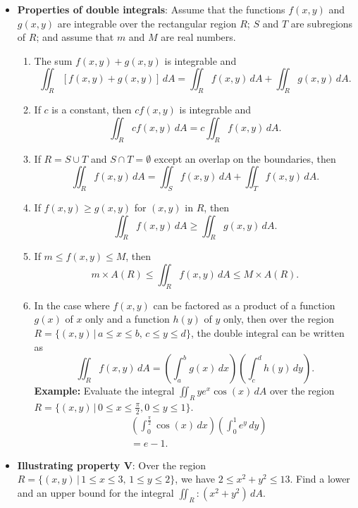 \documentclass{report}
\begin{document}
\begin{itemize}
        \item \textbf{Properties of double integrals}:
            Assume that the functions $f(x,y)$ and $g(x,y)$ are integrable over the rectangular region $R$; $S$ and $T$ are subregions of $R$; and assume that $m$ and $M$ are real numbers.
            \begin{enumerate}[label=\Roman*.]
                \item The sum $f(x,y) + g(x,y)$ is integrable and
                    \[\iint_{R} [f(x,y) + g(x,y)] \, dA = \iint_{R} f(x,y) \, dA + \iint_{R} g(x,y) \, dA.\]
                \item If $c$ is a constant, then $cf(x,y)$ is integrable and
                    \[\iint_{R} cf(x,y) \, dA = c \iint_{R} f(x,y) \, dA.\]
                \item If $R = S \cup T$ and $S \cap T = \emptyset$ except an overlap on the boundaries, then
                    \[\iint_{R} f(x,y) \, dA = \iint_{S} f(x,y) \, dA + \iint_{T} f(x,y) \, dA.\]
                \item If $f(x,y) \geq g(x,y)$ for $(x,y)$ in $R$, then
                    \[\iint_{R} f(x,y) \, dA \geq \iint_{R} g(x,y) \, dA.\]
                \item If $m \leq f(x,y) \leq M$, then
                    \[m \times A(R) \leq \iint_{R} f(x,y) \, dA \leq M \times A(R).\]
                \item In the case where $f(x,y)$ can be factored as a product of a function $g(x)$ of $x$ only and a function $h(y)$ of $y$ only, then over the region $R = \{(x,y) \,|\, a \leq x \leq b, \, c \leq y \leq d\}$, the double integral can be written as
                    \[\iint_{R} f(x,y) \, dA = \left( \int_{a}^{b} g(x) \, dx \right) \left( \int_{c}^{d} h(y) \, dy \right).\]
                    \bigbreak \noindent 
                    \textbf{Example:} Evaluate the integral $\iint_{R} ye^{x} \cos(x) \, dA$ over the region $R = \{(x,y) \, | \, 0 \leq x \leq \frac{\pi}{2}, 0 \leq y \leq 1\}$.
                    \begin{align*}
                        &\left(\int_0^{\frac{\pi}{2}}\cos{\left(x\right)}\,dx\right)\left(\int_0^{1}e^{y}\,dy\right) \\
                        &=e-1
                    .\end{align*}
            \end{enumerate}
        \item \textbf{Illustrating property V}: Over the region $R = \{(x,y) \,|\, 1 \leq x \leq 3, \, 1 \leq y \leq 2\}$, we have $2 \leq x^2 + y^2 \leq 13$. Find a lower and an upper bound for the integral $\iint_{R}: (x^2 + y^2) \, dA$.

\end{itemize}
\end{document}
